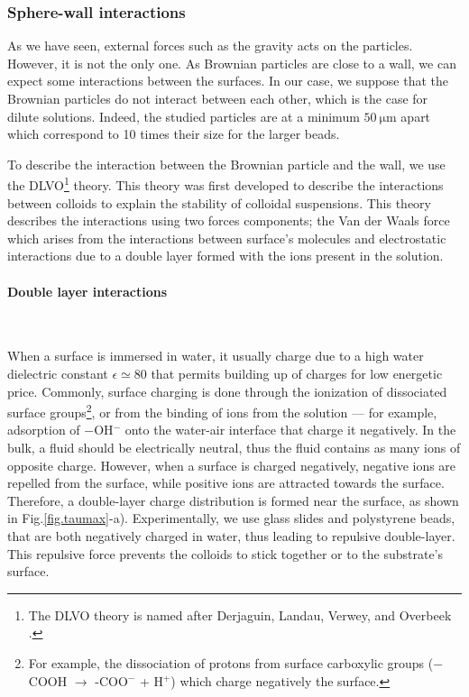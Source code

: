 \subsubsection{Sphere-wall interactions}
\label{Section:sphere-wall}

 

As we have seen, external forces such as the gravity acts on the particles. However, it is not the only one. As Brownian particles are close to a wall, we can expect some interactions between the surfaces. In our case, we suppose that the Brownian particles do not interact between each other, which is the case for dilute solutions. Indeed, the studied particles are at a minimum $50 ~ \mathrm{\mu m}$ apart which correspond to 10 times their size for the larger beads. 

To describe the interaction between the Brownian particle and the wall, we use the DLVO\footnote{The DLVO theory is named after Derjaguin, Landau, Verwey, and Overbeek \cite{israelachvili_intermolecular_2015}.} theory. This theory was first developed to describe the interactions between colloids to explain the stability of colloidal suspensions. This theory describes the interactions using two forces components; the Van der Waals force which arises from the interactions between surface's molecules and electrostatic interactions due to a double layer formed with the ions present in the solution. 

\paragraph{Double layer interactions}\mbox{}\\
\vspace{0.10cm}


When a surface is immersed in water, it usually charge \cite{israelachvili_intermolecular_2015} due to a high water dielectric constant $\epsilon \simeq 80$ that permits building up of charges for low energetic price. Commonly, surface charging is done through the ionization of dissociated surface groups\footnote{For example, the dissociation of protons from surface carboxylic groups \cite{israelachvili_intermolecular_2015} ($-$COOH $\rightarrow$ -COO$^-$ + H$^+$) which charge negatively the surface.}, or from the binding of ions from the solution --- for example, adsorption of $-$OH$^-$ onto the water-air interface that charge it negatively. In the bulk, a fluid should be electrically neutral, thus the fluid contains as many ions of opposite charge. However, when a surface is charged negatively, negative ions are repelled from the surface, while positive ions are attracted towards the surface.  Therefore, a double-layer charge distribution is formed near the surface, as shown in Fig.\ref{fig.taumax}-a). Experimentally, we use glass slides and polystyrene beads, that are both negatively charged in water, thus leading to repulsive double-layer. This repulsive force prevents the colloids to stick together or to the substrate's surface.


